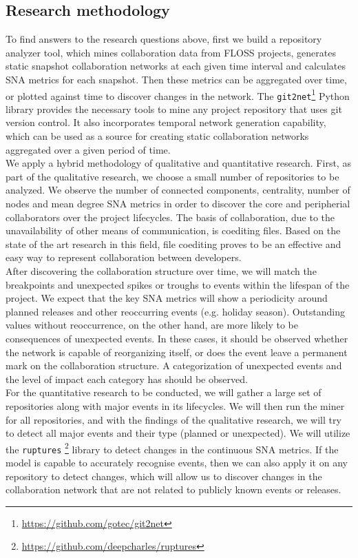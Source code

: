 \subsection{Research methodology}
To find answers to the research questions above, first we build a repository analyzer tool, which mines collaboration data from FLOSS projects, generates static snapshot collaboration networks at each given time interval and calculates SNA metrics for each snapshot. Then these metrics can be aggregated over time, or plotted against time to discover changes in the network. The \texttt{git2net}\footnote{\url{https://github.com/gotec/git2net}} \cite{goteAnalysingTimeStampedCoEditing2019} Python library provides the necessary tools to mine any project repository that uses git version control. It also incorporates temporal network generation capability, which can be used as a source for creating static collaboration networks aggregated over a given period of time. \\


We apply a hybrid methodology of qualitative and quantitative research. First, as part of the qualitative research, we choose a small number of repositories to be analyzed. We observe the number of connected components, centrality, number of nodes and mean degree SNA metrics in order to discover the core and peripherial collaborators over the project lifecycles. The basis of collaboration, due to the unavailability of other means of communication, is coediting files. Based on the state of the art research in this field, file coediting proves to be an effective and easy way to represent collaboration between developers. \\

After discovering the collaboration structure over time, we will match the breakpoints and unexpected spikes or troughs to events within the lifespan of the project. We expect that the key SNA metrics will show a periodicity around planned releases and other reoccurring events (e.g. holiday season). Outstanding values without reoccurrence, on the other hand, are more likely to be consequences of unexpected events. In these cases, it should be observed whether the network is capable of reorganizing itself, or does the event leave a permanent mark on the collaboration structure. A categorization of unexpected events and the level of impact each category has should be observed. \\

For the quantitative research to be conducted, we will gather a large set of repositories along with major events in its lifecycles. We will then run the miner for all repositories, and with the findings of the qualitative research, we will try to detect all major events and their type (planned or unexpected). We will utilize the \texttt{ruptures} \footnote{\url{https://github.com/deepcharles/ruptures}} library to detect changes in the continuous SNA metrics. If the model is capable to accurately recognise events, then we can also apply it on any repository to detect changes, which will allow us to discover changes in the collaboration network that are not related to publicly known events or releases. \\

